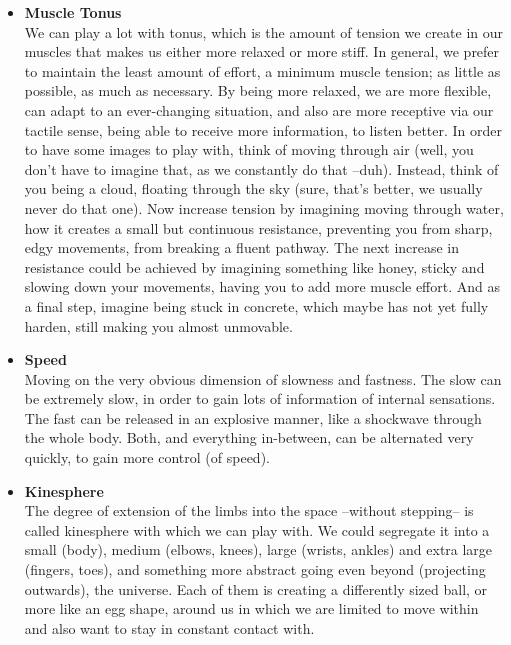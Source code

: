 \begin{itemize}
    \item [] \textbf{Muscle Tonus} \\
    We can play a lot with tonus, which is the amount of tension we create in our muscles that makes us either more relaxed or more stiff.
    In general, we prefer to maintain the least amount of effort, a minimum muscle tension; as little as possible, as much as necessary.
    By being more relaxed, we are more flexible, can adapt to an ever-changing situation, and also are more receptive via our tactile sense, being able to receive more information, to listen better.
    In order to have some images to play with, think of moving through air (well, you don't have to imagine that, as we constantly do that --duh).
    Instead, think of you being a cloud, floating through the sky (sure, that's better, we usually never do that one).
    Now increase tension by imagining moving through water, how it creates a small but continuous resistance, preventing you from sharp, edgy movements, from breaking a fluent pathway.
    The next increase in resistance could be achieved by imagining something like honey, sticky and slowing down your movements, having you to add more muscle effort.
    And as a final step, imagine being stuck in concrete, which maybe has not yet fully harden, still making you almost unmovable.

    \item [] \textbf{Speed} \\
    Moving on the very obvious dimension of slowness and fastness.
    The slow can be extremely slow, in order to gain lots of information of internal sensations.
    The fast can be released in an explosive manner, like a shockwave through the whole body.
    Both, and everything in-between, can be alternated very quickly, to gain more control (of speed).

    \item [] \textbf{Kinesphere} \\
    The degree of extension of the limbs into the space --without stepping-- is called \gls{kinesphere} with which we can play with.
    We could segregate it into a small (body), medium (elbows, knees), large (wrists, ankles) and extra large (fingers, toes), and something more abstract going even beyond (projecting outwards), the universe.
    Each of them is creating a differently sized ball, or more like an egg shape, around us in which we are limited to move within and also want to stay in constant contact with.


\end{itemize}
